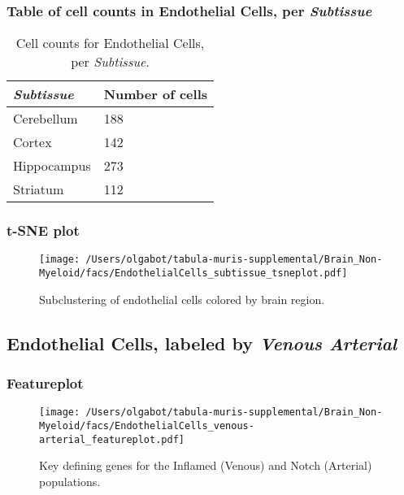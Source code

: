 \subsubsection{Table of cell counts in Endothelial Cells, per \emph{Subtissue}}\begin{table}[h]
\centering
\label{my-label}
\begin{tabular}{@{}ll@{}}
\toprule

\emph{Subtissue}& Number of cells \\ \midrule
Cerebellum & 188 \\

Cortex & 142 \\

Hippocampus & 273 \\

Striatum & 112 \\
\bottomrule
\end{tabular}
\caption{Cell counts for Endothelial Cells, per \emph{Subtissue}.}
\end{table}

\clearpage
\subsubsection{t-SNE plot}
\begin{figure}[h]
\centering
\texttt{[image: /Users/olgabot/tabula-muris-supplemental/Brain\_Non-Myeloid/facs/EndothelialCells\_subtissue\_tsneplot.pdf]}

\caption{Subclustering of endothelial cells colored by brain region.
}
\end{figure}


\clearpage

\subsection{Endothelial Cells, labeled by \emph{Venous Arterial}}

\clearpage
\subsubsection{Featureplot}
\begin{figure}[h]
\centering
\texttt{[image: /Users/olgabot/tabula-muris-supplemental/Brain\_Non-Myeloid/facs/EndothelialCells\_venous-arterial\_featureplot.pdf]}

\caption{Key defining genes for the Inflamed (Venous) and Notch (Arterial) populations.
}
\end{figure}


